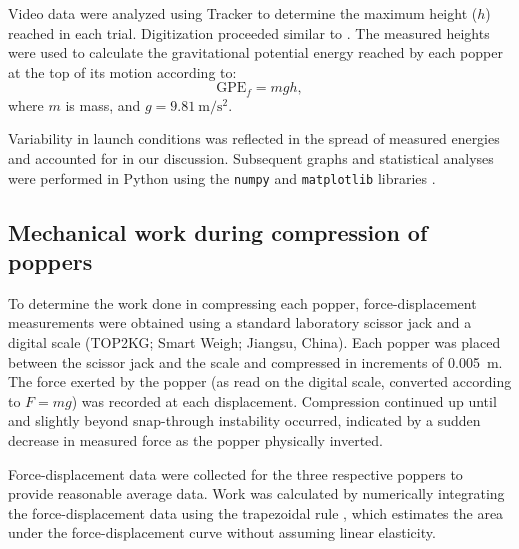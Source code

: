 \documentclass[reprint,amsmath,amssymb,aps,twoside]{revtex4-2} %
\begin{document}
Video data were analyzed using Tracker \cite{tracker,renika:2024:kinematics} to determine the maximum height ($h$) reached in each trial. Digitization proceeded similar to \cite{levine:2026:acceleration,dakwale:2026:effect,sharma:2026:analyzing,ahmadzada:2026:downward,hallur:2026:objects,brunie:2026:testing}. The measured heights were used to calculate the gravitational potential energy reached by each popper at the top of its motion according to:
\begin{equation}
\text{GPE}_f = mgh,
\end{equation}
where $m$ is mass, and $g=\qty{9.81}{\meter\per\second\squared}$. 

Variability in launch conditions was reflected in the spread of measured energies and accounted for in our discussion. Subsequent graphs and statistical analyses were performed in Python using the \texttt{numpy} and \texttt{matplotlib} libraries \cite{numpy,scipy,matplotlib}.



\subsection{Mechanical work during compression of poppers}
To determine the work done in compressing each popper, force-displacement measurements were obtained using a standard laboratory scissor jack and a digital scale (TOP2KG; Smart Weigh; Jiangsu, China). Each popper was placed between the scissor jack and the scale and compressed in increments of \qty{0.005}{\meter}. The force exerted by the popper (as read on the digital scale, converted according to $F=mg$) was recorded at each displacement. Compression continued up until and slightly beyond snap-through instability occurred, indicated by a sudden decrease in measured force as the popper physically inverted.

Force-displacement data were collected for the three respective poppers to provide reasonable average data. %
Work was calculated by numerically integrating the force-displacement data using the trapezoidal rule \cite{calculus,numpy,scipy}, which estimates the area under the force-displacement curve without assuming linear elasticity. 
\end{document}
